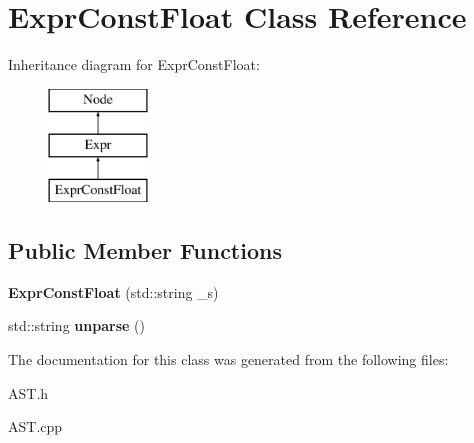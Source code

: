 \hypertarget{classExprConstFloat}{\section{Expr\-Const\-Float Class Reference}
\label{classExprConstFloat}
}
Inheritance diagram for Expr\-Const\-Float\-:\begin{figure}[H]
\begin{center}
\leavevmode
\includegraphics[height=3.000000cm]{classExprConstFloat}
\end{center}
\end{figure}
\subsection*{Public Member Functions}
\begin{DoxyCompactItemize}
\item 
\hypertarget{classExprConstFloat_ae6e4e3f546e3094f5318e834aa12e0f1}{{\bfseries Expr\-Const\-Float} (std\-::string \-\_\-s)}\label{classExprConstFloat_ae6e4e3f546e3094f5318e834aa12e0f1}

\item 
\hypertarget{classExprConstFloat_ab533717ee345d68d7bf4e46fc94572e6}{std\-::string {\bfseries unparse} ()}\label{classExprConstFloat_ab533717ee345d68d7bf4e46fc94572e6}

\end{DoxyCompactItemize}


The documentation for this class was generated from the following files\-:\begin{DoxyCompactItemize}
\item 
A\-S\-T.\-h\item 
A\-S\-T.\-cpp\end{DoxyCompactItemize}
